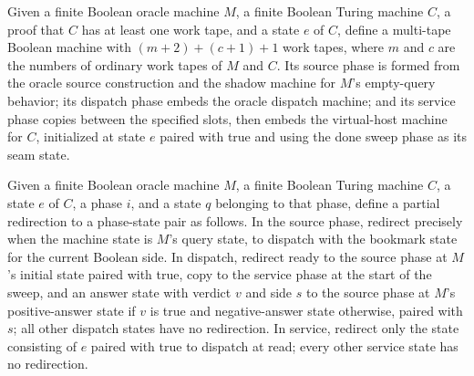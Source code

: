 \begin{definition}
\label{Turing.oraclePhases}
\leanok
{}
Given a finite Boolean oracle machine $M$, a finite Boolean Turing machine $C$, a proof
that $C$ has at least one work tape, and a state $e$ of $C$, define a multi-tape Boolean
machine with $(m+2)+(c+1)+1$ work tapes, where $m$ and $c$ are the numbers of ordinary
work tapes of $M$ and $C$. Its source phase is formed from the oracle source
construction and the shadow machine for $M$'s empty-query behavior; its dispatch phase
embeds the oracle dispatch machine; and its service phase copies between the specified
slots, then embeds the virtual-host machine for $C$, initialized at state $e$ paired
with true and using the done sweep phase as its seam state.
\end{definition}

\begin{definition}
\label{Turing.oracleRedirect}
\leanok
{}
Given a finite Boolean oracle machine $M$, a finite Boolean Turing machine $C$, a state
$e$ of $C$, a phase $i$, and a state $q$ belonging to that phase, define a partial
redirection to a phase-state pair as follows. In the source phase, redirect precisely
when the machine state is $M$'s query state, to dispatch with the bookmark state for the
current Boolean side. In dispatch, redirect ready to the source phase at $M$'s initial
state paired with true, copy to the service phase at the start of the sweep, and an
answer state with verdict $v$ and side $s$ to the source phase at $M$'s positive-answer
state if $v$ is true and negative-answer state otherwise, paired with $s$; all other
dispatch states have no redirection. In service, redirect only the state consisting of
$e$ paired with true to dispatch at read; every other service state has no redirection.
\end{definition}

